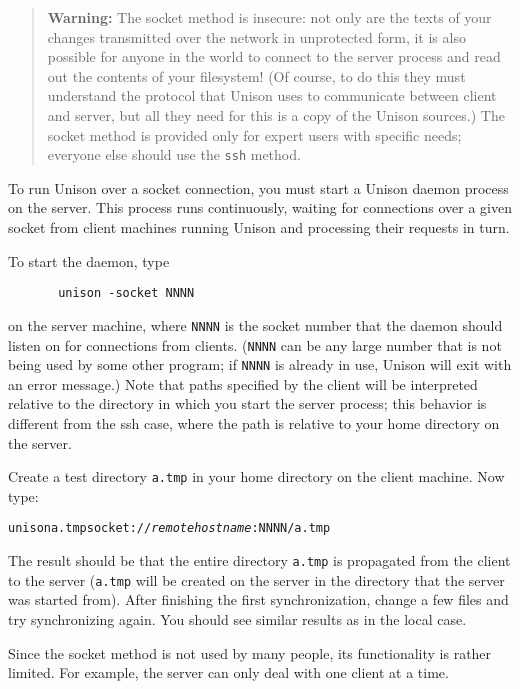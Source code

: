 \documentclass{article}
\newcommand{\NT}[1]{\textit{#1}}
\begin{document}

\begin{quote}
  {\bf\ifhevea\red\fi Warning:} The socket method is 
  insecure: not only are the texts of your changes transmitted over
  the network in unprotected form, it is also possible for anyone in
  the world to connect to the server process and read out the contents
  of your filesystem!  (Of course, to do this they must understand the
  protocol that Unison uses to communicate between client and server,
  but all they need for this is a copy of the Unison sources.)  The socket
  method is provided only for expert users with specific needs; everyone
  else should use the \verb|ssh| method.
\end{quote}

To run Unison over a socket connection, you must start a Unison
daemon process on the server.  This process runs continuously,
waiting for connections over a given socket from client machines
running Unison and processing their requests in turn.

To start the daemon, type
\begin{verbatim}
       unison -socket NNNN
\end{verbatim}
on the server machine, where {\tt NNNN} is the socket number that the
daemon should listen on for connections from clients.  ({\tt NNNN} can
be any large number that is not being used by some other program; if
\texttt{NNNN} is already in use, Unison will exit with an error
message.)  Note that paths specified by the client will be interpreted
relative to the directory in which you start the server process; this
behavior is different from the ssh case, where the path is relative to
your home directory on the server.

Create a test directory {\tt a.tmp} in your home directory on the
client machine.  Now type:
\begin{alltt}
       unison a.tmp socket://\NT{remotehostname}:NNNN/a.tmp
\end{alltt}
The result should be that the entire directory {\tt a.tmp} is
propagated from the client to the server (\texttt{a.tmp} will be
created on the server in the directory that the server was started
from).
%
After finishing the first synchronization, change a few files and try
synchronizing again.  You should see similar results as in the local
case.

Since the socket method is not used by many people, its functionality is
rather limited.  For example, the server can only deal with one client at a
time. 
\end{document}
